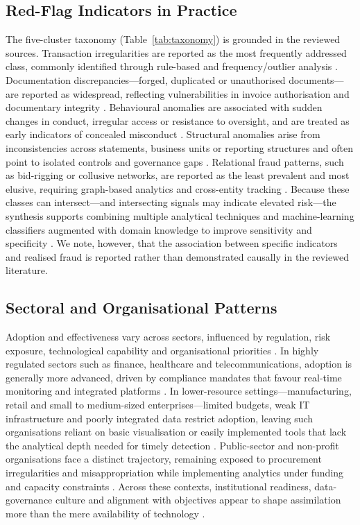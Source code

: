 \documentclass[conference]{IEEEtran}
\begin{document}
\subsection{Red-Flag Indicators in Practice}

The five-cluster taxonomy (Table~\ref{tab:taxonomy}) is grounded in the reviewed sources. Transaction irregularities are reported as the most frequently addressed class, commonly identified through rule-based and frequency/outlier analysis \cite{b39}. Documentation discrepancies---forged, duplicated or unauthorised documents---are reported as widespread, reflecting vulnerabilities in invoice authorisation and documentary integrity \cite{b40}. Behavioural anomalies are associated with sudden changes in conduct, irregular access or resistance to oversight, and are treated as early indicators of concealed misconduct \cite{b41}. Structural anomalies arise from inconsistencies across statements, business units or reporting structures and often point to isolated controls and governance gaps \cite{b42}. Relational fraud patterns, such as bid-rigging or collusive networks, are reported as the least prevalent and most elusive, requiring graph-based analytics and cross-entity tracking \cite{b43}. Because these classes can intersect---and intersecting signals may indicate elevated risk---the synthesis supports combining multiple analytical techniques and machine-learning classifiers augmented with domain knowledge to improve sensitivity and specificity \cite{b44,b45}. We note, however, that the association between specific indicators and realised fraud is reported rather than demonstrated causally in the reviewed literature.

\subsection{Sectoral and Organisational Patterns}

Adoption and effectiveness vary across sectors, influenced by regulation, risk exposure, technological capability and organisational priorities \cite{b47}. In highly regulated sectors such as finance, healthcare and telecommunications, adoption is generally more advanced, driven by compliance mandates that favour real-time monitoring and integrated platforms \cite{b48}. In lower-resource settings---manufacturing, retail and small to medium-sized enterprises---limited budgets, weak IT infrastructure and poorly integrated data restrict adoption, leaving such organisations reliant on basic visualisation or easily implemented tools that lack the analytical depth needed for timely detection \cite{b49,b50}. Public-sector and non-profit organisations face a distinct trajectory, remaining exposed to procurement irregularities and misappropriation while implementing analytics under funding and capacity constraints \cite{b51,b52}. Across these contexts, institutional readiness, data-governance culture and alignment with objectives appear to shape assimilation more than the mere availability of technology \cite{b53}.
\end{document}
